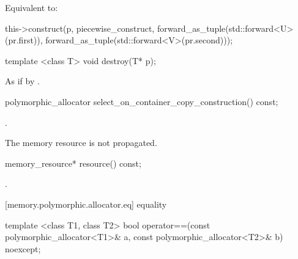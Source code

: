 \begin{itemdescr}
\pnum
\effects
Equivalent to:
\begin{codeblock}
this->construct(p, piecewise_construct,
                forward_as_tuple(std::forward<U>(pr.first)),
                forward_as_tuple(std::forward<V>(pr.second)));
\end{codeblock}
\end{itemdescr}

%
%
\begin{itemdecl}
template <class T>
  void destroy(T* p);
\end{itemdecl}

\begin{itemdescr}
\pnum
\effects
As if by .
\end{itemdescr}

%
%
\begin{itemdecl}
polymorphic_allocator select_on_container_copy_construction() const;
\end{itemdecl}

\begin{itemdescr}
\pnum
\returns
{}.

\pnum
\enternote
The memory resource is not propagated.
\exitnote
\end{itemdescr}

%
%
\begin{itemdecl}
memory_resource* resource() const;
\end{itemdecl}

\begin{itemdescr}
\pnum
\returns
{}.
\end{itemdescr}

[memory.polymorphic.allocator.eq]{ equality}

%
\begin{itemdecl}
template <class T1, class T2>
  bool operator==(const polymorphic_allocator<T1>& a,
                  const polymorphic_allocator<T2>& b) noexcept;
\end{itemdecl}


